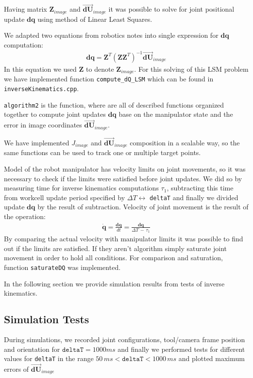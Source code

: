 \documentclass[]{scrartcl}
\begin{document}
Having matrix $\boldsymbol{Z}_{image}$ and $\overrightarrow{\boldsymbol{dU}}_{image}$ it was possible to solve for joint positional update ${\boldsymbol{dq}}$ using method of Linear Least Squares.

We adapted two equations from robotics notes into single expression for ${\boldsymbol{dq}}$ computation:
\begin{align}
	\boldsymbol{dq} = \boldsymbol{Z}^T\left(\boldsymbol{Z}\boldsymbol{Z}^T\right)^{-1} \overrightarrow{\boldsymbol{dU}}_{image}
\end{align}
In this equation we used $\boldsymbol{Z}$ to denote $\boldsymbol{Z}_{image}$.
For this solving of this LSM problem we have implemented function \texttt{compute\_dQ\_LSM} which can be found in \texttt{inverseKinematics.cpp}.

\texttt{algorithm2} is the function, where are all of described functions organized together to compute joint updates $\boldsymbol{dq}$ base on the manipulator state and the error in image coordinates $\overrightarrow{\boldsymbol{dU}}_{image}$.

We have implemented $J_{image}$ and $\overrightarrow{\boldsymbol{dU}}_{image}$ composition in a scalable way, so the same functions can be used to track one or multiple target points.

Model of the robot manipulator has velocity limits on joint movements, so it was necessary to check if the limits were satisfied before joint updates. We did so by measuring time for inverse kinematics computations $\tau_1$, subtracting this time from workcell update period specified by $\Delta T \longleftrightarrow$ \texttt{deltaT} and finally we divided update $\boldsymbol{dq}$ by the result of subtraction. Velocity of joint movement is the result of the operation:
\begin{align}
	\boldsymbol{\dot{q}} = \frac{\boldsymbol{dq}}{dt} = \frac{\boldsymbol{dq}}{\Delta T\, -\, \tau_1}
\end{align}
By comparing the actual velocity with manipulator limits it was possible to find out if the limits are satisfied. If they aren't algorithm simply saturate joint movement in order to hold all conditions. For comparison and saturation, function \texttt{saturateDQ} was implemented.

In the following section we provide simulation results from tests of inverse kinematics.

\subsection{Simulation Tests}
During simulations, we recorded joint configurations, tool/camera frame position and orientation for $\texttt{deltaT} = 1000 ms$ and finally we performed tests for different values for \texttt{deltaT} in the range $50\, ms < \texttt{deltaT} < 1000\, ms$ and plotted maximum errors of 
$\overrightarrow{\boldsymbol{dU}}_{image}$
\end{document}
